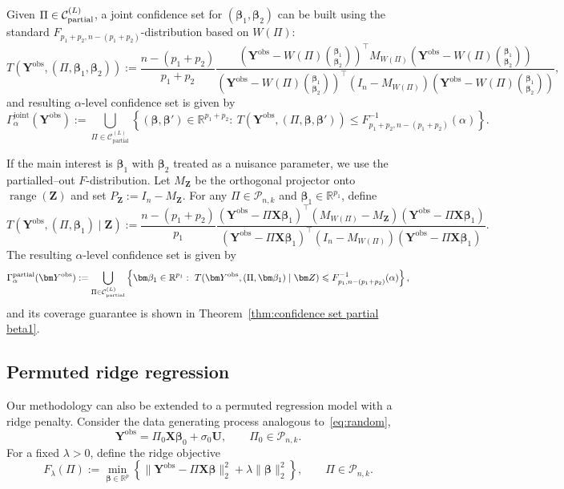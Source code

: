 \documentclass[11pt, reqno]{amsart}
\newcommand{\R}{\mathbb{R}}
\renewcommand{\le}{\leqslant}
\newcommand{\mP}{\mathcal{P}}
\newcommand{\1}{\mbox{1}\hspace{-0.25em}\mbox{l}}
\newcommand{\obs}{\mathrm{obs}}
\DeclareMathOperator{\range}{range}
\theoremstyle{definition}\newtheorem{problem}{Problem}[section]
\theoremstyle{definition}\newtheorem{definition}[problem]{Definition}
\theoremstyle{remark}\newtheorem{assumption}{Assumption}
\theoremstyle{remark}\newtheorem{remark}[problem]{Remark}
\theoremstyle{definition}\newtheorem{example}[problem]{Example}
\theoremstyle{plain}\newtheorem{theorem}[problem]{Theorem}
\theoremstyle{plain}\newtheorem{question}[problem]{Question}
\theoremstyle{plain}\newtheorem{lemma}[problem]{Lemma}
\theoremstyle{plain}\newtheorem{proposition}[problem]{Proposition}
\theoremstyle{plain}\newtheorem{corollary}[problem]{Corollary}
\theoremstyle{plain}\newtheorem{conjecture}[problem]{Conjecture}
\begin{document}
Given $\Pi\in\mathcal{C}_{\rm partial}^{(L)}$, a joint confidence set for $(\bm\beta_1,\bm\beta_2)$ 
can be built using the standard $F_{p_1+p_2,n-(p_1+p_2)}$-distribution based on $W(\Pi)$:
\begin{equation}\label{eq:Tjointpartial-def}
T(\bm Y^{\obs},(\Pi,\bm\beta_1,\bm\beta_2))
:=\frac{n-(p_1+p_2)}{p_1+p_2}
\frac{\left(\bm Y^{\obs}-W(\Pi)\binom{\bm\beta_1}{\bm\beta_2}\right)^\top M_{W(\Pi)}
      \left(\bm Y^{\obs}-W(\Pi)\binom{\bm\beta_1}{\bm\beta_2}\right)}
     {\left(\bm Y^{\obs}-W(\Pi)\binom{\bm\beta_1}{\bm\beta_2}\right)^\top (I_n-M_{W(\Pi)})
      \left(\bm Y^{\obs}-W(\Pi)\binom{\bm\beta_1}{\bm\beta_2}\right)},
\end{equation}
and resulting $\alpha$-level confidence set is given by
\begin{equation}\label{eq:confset-partial-joint}
\Gamma_{\alpha}^{\mathrm{joint}}(\bm{Y}^{\obs})
:=\bigcup_{\Pi \in \mathcal{C}_{\mathrm{partial}}^{(L)}} \left\{
(\bm\beta,\bm\beta')\in \R^{p_1+p_2}:\ 
T(\bm Y^{\obs},(\Pi,\bm\beta,\bm\beta')) \le F_{p_1+p_2,n-(p_1+p_2)}^{-1}(\alpha)
\right\}.
\end{equation}

If the main interest is $\bm\beta_1$ with $\bm\beta_2$ treated as a nuisance parameter, we use the
partialled--out $F$-distribution.  Let $M_{\bm Z}$ be the orthogonal projector onto $\range(\bm Z)$ and
set $P_{\bm Z}:=I_n-M_{\bm Z}$. For any $\Pi\in\mP_{n,k}$ and $\bm\beta_1\in\mathbb R^{p_1}$,
define
\begin{equation}\label{eq:Tpartial-def}
T(\bm Y^{\obs},(\Pi,\bm\beta_1)\mid \bm Z)
:=\frac{n-(p_1+p_2)}{p_1}
\frac{
(\bm Y^{\obs}-\Pi\bm X\bm\beta_1)^\top (M_{W(\Pi)}-M_{\bm Z}) (\bm Y^{\obs}-\Pi\bm X\bm\beta_1)
}{
(\bm Y^{\obs}-\Pi\bm X\bm\beta_1)^\top (I_n-M_{W(\Pi)}) (\bm Y^{\obs}-\Pi\bm X\bm\beta_1)
}.
\end{equation}
The resulting $\alpha$-level confidence set is given by
\[
\Gamma_{\alpha}^{\rm partial}(\bm Y^{\obs})
:=\bigcup_{\Pi\in\mathcal C_{\rm partial}^{(L)}}
\left\{
\bm\beta_1\in\mathbb R^{p_1}:\ 
T(\bm Y^{\obs},(\Pi,\bm\beta_1)\mid \bm Z)\le F_{p_1,n-(p_1+p_2)}^{-1}(\alpha)
\right\},
\]
and its coverage guarantee is shown in Theorem~\ref{thm:confidence set partial beta1}.

\subsection{Permuted ridge regression}
Our methodology can also be extended to a permuted regression model with a ridge penalty.
Consider the data generating process analogous to~\eqref{eq:random},
\[
\bm Y^{\mathrm{obs}}=\Pi_{0}\bm X\bm{\beta}_{0}+\sigma_{0}\bm U,
\qquad \Pi_0\in\mP_{n,k}.
\]
For a fixed $\lambda>0$, define the ridge objective
\[
F_\lambda(\Pi):=\min_{\bm{\beta}\in\R^p}
\left\{\|\bm Y^{\mathrm{obs}}-\Pi\bm X\bm{\beta}\|_2^2+\lambda\|\bm{\beta}\|_2^2\right\},
\qquad \Pi\in\mP_{n,k}.
\]
\end{document}
